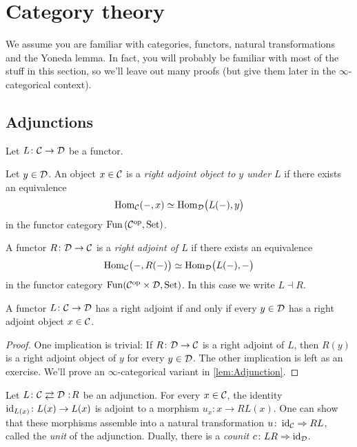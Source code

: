 \section{Category theory}\label{sec:CategoryTheory}
We assume you are familiar with categories, functors, natural transformations and the Yoneda lemma. In fact, you will probably be familiar with most of the stuff in this section, so we'll leave out many proofs (but give them later in the $\infty$-categorical context).

\subsection{Adjunctions}
\begin{defi}\label{def:1Adjunction}
	Let $L\colon \mathcal{C}\rightarrow \mathcal{D}$ be a functor.
	\begin{alphanumerate}
		\item Let $y\in \mathcal{D}$. An object $x\in \mathcal{C}$ is a \emph{right adjoint object to $y$ under $L$} if there exists an equivalence
		\begin{equation*}
			\Hom_\Cc\!\left(-,x\right)\simeq \Hom_\Dd\lef(L(-),y\righ)
		\end{equation*}
		in the functor category $\operatorname{Fun}\left(\mathcal{C}^{\mathrm{op}},\mathrm{Set}\right)$.
		\item A functor $R\colon \mathcal{D}\rightarrow \mathcal{C}$ is a \emph{right adjoint of $L$} if there exists an equivalence
		\begin{equation*}
			\Hom_\Cc\lef(-,R(-)\righ)\simeq \Hom_\Dd\lef(L(-),-\righ)
		\end{equation*}
		in the functor category $\operatorname{Fun}(\mathcal{C}^{\mathrm{op}}\times \mathcal{D},\mathrm{Set})$. In this case we write $L\dashv R$.
	\end{alphanumerate}
\end{defi}
\begin{lem}\label{lem:1Adjunction}
	A functor $L\colon \mathcal{C}\rightarrow \mathcal{D}$ has a right adjoint if and only if every $y\in \mathcal{D}$ has a right adjoint object $x\in \mathcal{C}$.
\end{lem}
\begin{proof}
	One implication is trivial: If $R\colon \mathcal{D}\rightarrow \mathcal{C}$ is a right adjoint of $L$, then $R(y)$ is a right adjoint object of $y$ for every $y\in \mathcal{D}$. The other implication is left as an exercise. We'll prove an $\infty$-categorical variant in \cref{lem:Adjunction}.
\end{proof}
\begin{con}\label{con:1Unit}
	Let $L\colon \Cc \shortdoublelrmorphism \Dd\noloc R$ be an adjunction. For every $x\in \mathcal{C}$, the identity $\operatorname{id}_{L(x)}\colon L(x)\rightarrow L(x)$ is adjoint to a morphism $u_x\colon x\rightarrow RL(x)$. One can show that these morphisms assemble into a natural transformation $u\colon \operatorname{id}_{\mathcal{C}}\Rightarrow RL$, called the \emph{unit} of the adjunction. Dually, there is a \emph{counit} $c\colon LR\Rightarrow \operatorname{id}_{\mathcal{D}}$.
\end{con}
